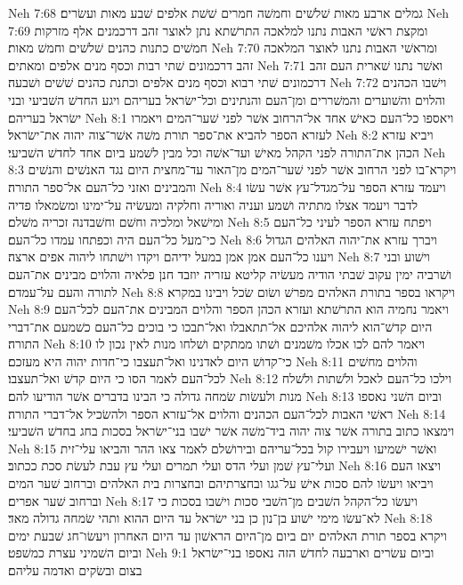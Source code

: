Neh 7:68  גמלים ארבע מאות שׁלשׁים וחמשׁה חמרים שׁשׁת אלפים שׁבע מאות ועשׂרים׃
Neh 7:69  ומקצת ראשׁי האבות נתנו למלאכה התרשׁתא נתן לאוצר זהב דרכמנים אלף מזרקות חמשׁים כתנות כהנים שׁלשׁים וחמשׁ מאות׃
Neh 7:70  ומראשׁי האבות נתנו לאוצר המלאכה זהב דרכמונים שׁתי רבות וכסף מנים אלפים ומאתים׃
Neh 7:71  ואשׁר נתנו שׁארית העם זהב דרכמונים שׁתי רבוא וכסף מנים אלפים וכתנת כהנים שׁשׁים ושׁבעה׃
Neh 7:72  וישׁבו הכהנים והלוים והשׁוערים והמשׁררים ומן־העם והנתינים וכל־ישׂראל בעריהם ויגע החדשׁ השׁביעי ובני ישׂראל בעריהם׃
Neh 8:1  ויאספו כל־העם כאישׁ אחד אל־הרחוב אשׁר לפני שׁער־המים ויאמרו לעזרא הספר להביא את־ספר תורת משׁה אשׁר־צוה יהוה את־ישׂראל׃
Neh 8:2  ויביא עזרא הכהן את־התורה לפני הקהל מאישׁ ועד־אשׁה וכל מבין לשׁמע ביום אחד לחדשׁ השׁביעי׃
Neh 8:3  ויקרא־בו לפני הרחוב אשׁר לפני שׁער־המים מן־האור עד־מחצית היום נגד האנשׁים והנשׁים והמבינים ואזני כל־העם אל־ספר התורה׃
Neh 8:4  ויעמד עזרא הספר על־מגדל־עץ אשׁר עשׂו לדבר ויעמד אצלו מתתיה ושׁמע ועניה ואוריה וחלקיה ומעשׂיה על־ימינו ומשׂמאלו פדיה ומישׁאל ומלכיה וחשׁם וחשׁבדנה זכריה משׁלם׃
Neh 8:5  ויפתח עזרא הספר לעיני כל־העם כי־מעל כל־העם היה וכפתחו עמדו כל־העם׃
Neh 8:6  ויברך עזרא את־יהוה האלהים הגדול ויענו כל־העם אמן אמן במעל ידיהם ויקדו וישׁתחו ליהוה אפים ארצה׃
Neh 8:7  וישׁוע ובני ושׁרביה ימין עקוב שׁבתי הודיה מעשׂיה קליטא עזריה יוזבד חנן פלאיה והלוים מבינים את־העם לתורה והעם על־עמדם׃
Neh 8:8  ויקראו בספר בתורת האלהים מפרשׁ ושׂום שׂכל ויבינו במקרא׃
Neh 8:9  ויאמר נחמיה הוא התרשׁתא ועזרא הכהן הספר והלוים המבינים את־העם לכל־העם היום קדשׁ־הוא ליהוה אלהיכם אל־תתאבלו ואל־תבכו כי בוכים כל־העם כשׁמעם את־דברי התורה׃
Neh 8:10  ויאמר להם לכו אכלו משׁמנים ושׁתו ממתקים ושׁלחו מנות לאין נכון לו כי־קדושׁ היום לאדנינו ואל־תעצבו כי־חדות יהוה היא מעזכם׃
Neh 8:11  והלוים מחשׁים לכל־העם לאמר הסו כי היום קדשׁ ואל־תעצבו׃
Neh 8:12  וילכו כל־העם לאכל ולשׁתות ולשׁלח מנות ולעשׂות שׂמחה גדולה כי הבינו בדברים אשׁר הודיעו להם׃
Neh 8:13  וביום השׁני נאספו ראשׁי האבות לכל־העם הכהנים והלוים אל־עזרא הספר ולהשׂכיל אל־דברי התורה׃
Neh 8:14  וימצאו כתוב בתורה אשׁר צוה יהוה ביד־משׁה אשׁר ישׁבו בני־ישׂראל בסכות בחג בחדשׁ השׁביעי׃
Neh 8:15  ואשׁר ישׁמיעו ויעבירו קול בכל־עריהם ובירושׁלם לאמר צאו ההר והביאו עלי־זית ועלי־עץ שׁמן ועלי הדס ועלי תמרים ועלי עץ עבת לעשׂת סכת ככתוב׃
Neh 8:16  ויצאו העם ויביאו ויעשׂו להם סכות אישׁ על־גגו ובחצרתיהם ובחצרות בית האלהים וברחוב שׁער המים וברחוב שׁער אפרים׃
Neh 8:17  ויעשׂו כל־הקהל השׁבים מן־השׁבי סכות וישׁבו בסכות כי לא־עשׂו מימי ישׁוע בן־נון כן בני ישׂראל עד היום ההוא ותהי שׂמחה גדולה מאד׃
Neh 8:18  ויקרא בספר תורת האלהים יום ביום מן־היום הראשׁון עד היום האחרון ויעשׂו־חג שׁבעת ימים וביום השׁמיני עצרת כמשׁפט׃
Neh 9:1  וביום עשׂרים וארבעה לחדשׁ הזה נאספו בני־ישׂראל בצום ובשׂקים ואדמה עליהם׃
